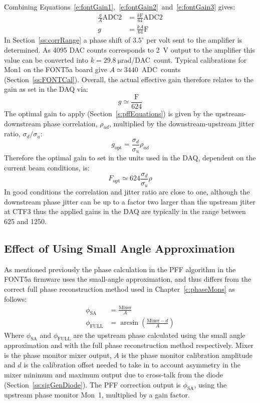 Combining Equations~\ref{e:fontGain1},~\ref{e:fontGain2}~and~\ref{e:fontGain3} gives:
\begin{align}
\frac{g}{A}\mathrm{ADC2} &= \frac{k\mathrm{F}}{64}\mathrm{ADC2} \nonumber \\
g &= \frac{kA}{64}\mathrm{F} \label{e:fontGain4}
\end{align}
In Section~\ref{ss:corrRange} a phase shift of \(3.5^\circ\) per volt sent to the amplifier is determined. As 4095 DAC counts corresponds to 2~V output to the amplifier this value can be converted into \(k = 29.8~\mathrm{\mu}\)rad/DAC~count. Typical calibrations for Mon1 on the FONT5a board give \(A \simeq 3440\)~ADC~counts (Section~\ref{ss:FONTCal}). Overall, the actual effective gain therefore relates to the gain as set in the DAQ via:
\begin{equation}
g \simeq \frac{\mathrm{F}}{624}
\end{equation}
The optimal gain to apply (Section~\ref{s:pffEquations}) is given by the upstream-downstream phase correlation, \(\rho_{ud}\), multiplied by the downstream-upstream jitter ratio, \(\sigma_{d}/\sigma_{u}\):
\begin{equation}
g_{\mathrm{opt}} = \frac{\sigma_{d}}{\sigma_{u}} \rho_{ud}  
\end{equation}
Therefore the optimal gain to set in the units used in the DAQ, dependent on the current beam conditions, is:
\begin{equation}
F_{\mathrm{opt}} \simeq 624 \frac{\sigma_{d}}{\sigma_{u}} \rho
\label{e:fontOptGain}
\end{equation}
In good conditions the correlation and jitter ratio are close to one, although the downstream phase jitter can be up to a factor two larger than the upstream jtiter at CTF3 thus the applied gains in the DAQ are typically in the range between 625 and 1250.

\subsection{Effect of Using Small Angle Approximation}
\label{ss:fontSmallAng}

As mentioned previously the phase calculation in the PFF algorithm in the FONT5a firmware uses the small-angle approximation, and thus differs from the correct full phase reconstruction method used in Chapter~\ref{c:phaseMons} as follows:
\begin{align}
\phi_{\mathrm{SA}} &= \frac{\mathrm{Mixer}}{A} \\
\phi_{\mathrm{FULL}} &= \arcsin\left(\frac{\mathrm{Mixer}-d}{A}\right)
\end{align}
Where \(\phi_{\mathrm{SA}}\) and \(\phi_{\mathrm{FULL}}\) are the upstream phase calculated using the small angle approximation
and with the full phase reconstruction method respectively. \(\mathrm{Mixer}\) is the phase monitor mixer output, \(A\) is the phase monitor calibration amplitude and \(d\) is the calibration offset needed to take in to account asymmetry in the mixer minimum and maximum output due to cross-talk from the diode (Section~\ref{ss:sigGenDiode}).
The PFF correction output is \(\phi_{\mathrm{SA}}\), using the upstream 
phase monitor Mon~1, multiplied by a gain factor.

